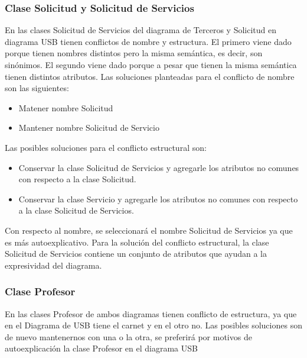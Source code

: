 \message{ !name(InformeFase2.tex)}\documentclass[12pt,a4paper,spanish]{article}
\begin{document}
\subsubsection{Clase Solicitud y Solicitud de Servicios}
\newline
\indent En las clases Solicitud de Servicios del diagrama de Terceros y Solicitud en diagrama USB tienen conflictos de nombre y estructura. El primero viene dado porque tienen nombres distintos pero la misma sem\'antica, es decir, son sin\'onimos. El segundo viene dado porque a pesar que tienen la misma sem\'antica tienen distintos atributos. 
\newline
\newline
\indent Las soluciones planteadas para el conflicto de nombre son las siguientes:
\begin{itemize}
\item Matener nombre Solicitud
\item Mantener nombre Solicitud de Servicio
\end{itemize}
\newline
\indent Las posibles soluciones para el conflicto estructural son:
\begin{itemize}
\item  Conservar la clase Solicitud de Servicios y agregarle los atributos no comunes con respecto a la clase Solicitud.
\item  Conservar la clase Servicio y agregarle los atributos no comunes con respecto a la clase Solicitud de Servicios.
\end{itemize}
\newline
\indent Con respecto al nombre, se seleccionar\'a el nombre Solicitud de Servicios ya que es m\'as autoexplicativo. Para la soluci\'on del conflicto estructural, la clase Solicitud de Servicios contiene un conjunto de atributos que ayudan a la expresividad del diagrama.
\newline
\newline
\subsubsection{Clase Profesor}
\indent En las clases Profesor de ambos diagramas tienen conflicto de estructura, ya que en el Diagrama de USB tiene el carnet y en el otro no. Las posibles soluciones son de nuevo mantenernos con una o la otra, se preferir\'a por motivos de autoexplicaci\'on la clase Profesor en el diagrama USB 
\newline
\newline
\end{document}

